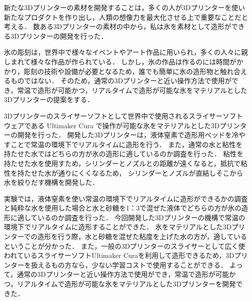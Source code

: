 新たな3Dプリンターの素材を開発することは，多くの人が3Dプリンターを使い新たなプロダクトを作り出し，人類の想像力を最大化させる上で重要なことだと考える．
数ある3Dプリンターの素材の中から，私は氷を素材として造形ができる3Dプリンターの開発を行った．

氷の彫刻は，世界中で様々なイベントやアート作品に用いられ，多くの人々に親しまれて様々な作品が作られている．
しかし，氷の作品は作るのには時間がかかり，彫刻の技術や設備が必要となるため，誰でも簡単に氷の造形物と触れ合えるものではない．
そのため，通常の3Dプリンターと近い操作方法で使用ができ，常温で造形が可能かつ，リアルタイムで造形が可能な氷をマテリアルとした3Dプリンターの提案をする．

3Dプリンターのスライサーソフトとして世界中で使用されるスライサーソフトウェアである Ultimaker Cura で操作が可能な氷をマテリアルとした3Dプリンターの開発を行った．
開発した3Dプリンターは，液体窒素で造形用ベッドを冷やすことで常温の環境下でリアルタイムに造形を行う．
また，通常の水と粘性を持たせた水ではどちらの方が氷の造形に適しているのか調査を行った．
粘性を持たせた水を使用すため，シリンダーとノズルとの距離が遠くなると，抵抗で粘性を持たせた水が通りにくくなるため，
シリンダーとノズルが直結しそこから水を絞りだす機構を開発した．

実験では，液体窒素を使い常温の環境下でリアルタイムに造形ができるかの調査と純粋な水を使用した場合と水と砂糖を1：3で混ぜた液体でどちらの方が氷の造形に適しているのか調査を行った．
今回開発した3Dプリンターの機構で常温の環境下でリアルタイムに造形することができた．
氷をマテリアルとした3Dプリンターでの造形を行う際，水と砂糖を混ぜた粘度を上げた水の方が，適しているということが分かった．
また，一般の3Dプリンターのスライサーとして広く使われているスライサーソフトUltimaker Curaを利用して造形できるため，3Dプリンターを扱えるもの方なら，少ない学習コストで使用することができる．
よって，通常の3Dプリンターと近い操作方法で使用ができ，常温で造形が可能かつ，リアルタイムで造形が可能な氷をマテリアルとした3Dプリンターを開発できた．
